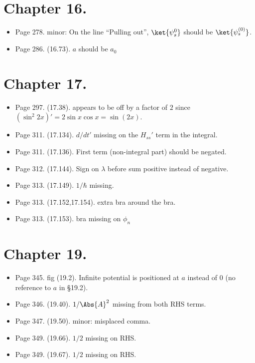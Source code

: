 \section{Chapter 16.}
\begin{itemize}
\item Page 278.  minor: On the line ``Pulling out'', $\ket{\psi_s^0}$ should be $\ket{\psi_s^{(0)}}$.
\item Page 286.  (16.73).  $a$ should be $a_0$
\end{itemize}

\section{Chapter 17.}
\begin{itemize}
\item Page 297.  (17.38).   appears to be off by a factor of $2$ since $(\sin^2 2x)' = 2 \sin x \cos x = \sin(2 x)$.
\item Page 311.  (17.134).  $d/dt'$ missing on the $H_{ss}'$ term in the integral.
\item Page 311.  (17.136).  First term (non-integral part) should be negated.
\item Page 312.  (17.144).  Sign on $\lambda$ before sum positive instead of negative.
\item Page 313.  (17.149).  $1/\hbar$ missing.
\item Page 313.  (17.152,17.154).  extra bra around the bra.
\item Page 313.  (17.153).  bra missing on $\phi_n$
\end{itemize}

\section{Chapter 19.}
\begin{itemize}
\item Page 345.  fig (19.2).  Infinite potential is positioned at $a$ instead of $0$ (no reference to $a$ in \S 19.2).
\item Page 346.  (19.40).  $1/\Abs{A}^2$ missing from both RHS terms.
\item Page 347.  (19.50).  minor: misplaced comma.
\item Page 349.  (19.66).  $1/2$ missing on RHS.
\item Page 349.  (19.67).  $1/2$ missing on RHS.
\end{itemize}

